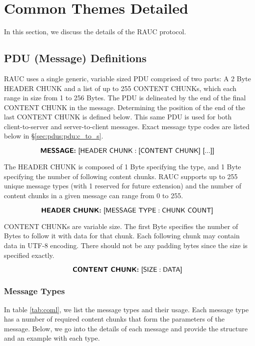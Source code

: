 \section{Common Themes Detailed}
\label{sec:ct}

In this section, we discuss the details of the \textsf{RAUC} protocol.

\subsection{PDU (Message) Definitions}
\label{sec:pdudef}
RAUC uses a single generic, variable sized PDU comprised of two parts: A 2 Byte HEADER CHUNK and a list of up to 255 CONTENT CHUNKs, which each range in size from 1 to 256 Bytes. The PDU is delineated by the end of the final CONTENT CHUNK in the message. Determining the position of the end of the last CONTENT CHUNK is defined below. This same PDU is used for both client-to-server and server-to-client messages. Exact message type codes are listed below in \S \ref{sec:pdus:pdu:c_to_s}.

\[\textsf{\textbf{MESSAGE:} [HEADER CHUNK} : \textsf{[CONTENT CHUNK] [...]]}\]

The HEADER CHUNK is composed of 1 Byte specifying the type, and 1 Byte specifying the number of following content chunks. RAUC supports up to 255 unique message types (with 1 reserved for future extension) and the number of content chunks in a given message can range from 0 to 255.

\[\textsf{\textbf{HEADER CHUNK:} [MESSAGE TYPE} : \textsf{CHUNK COUNT]}\]

CONTENT CHUNKs are variable size. The first Byte specifies the number of Bytes to follow it with data for that chunk. Each following chunk may contain data in UTF-8 encoding. There should not be any padding bytes since the size is specified exactly.

\[\textsf{\textbf{CONTENT CHUNK:} [SIZE} : \textsf{DATA]}\]

\subsubsection{Message Types}
In table \ref{tab:coml}, we list the message types and their usage. Each message type has a number of required content chunks that form the parameters of the message. Below, we go into the details of each message and provide the structure and an example with each type.

